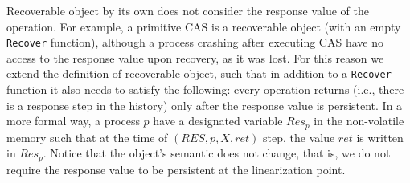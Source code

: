 {Recoverable object by its own does not consider the response value of the operation. For example, a primitive CAS is a recoverable object (with an empty \texttt{Recover} function), although a process crashing after executing CAS have no access to the response value upon recovery, as it was lost. For this reason we extend the definition of recoverable object, such that in addition to a \texttt{Recover} function it also needs to satisfy the following: every operation returns (i.e., there is a response step in the history) only after the response value is persistent. In a more formal way, a process $p$ have a designated variable $Res_p$ in the non-volatile memory such that at the time of $(RES,p,X,ret)$ step, the value $ret$ is written in $Res_p$.
Notice that the object's semantic does not change, that is, we do not require the response value to be persistent at the linearization point.
}%

